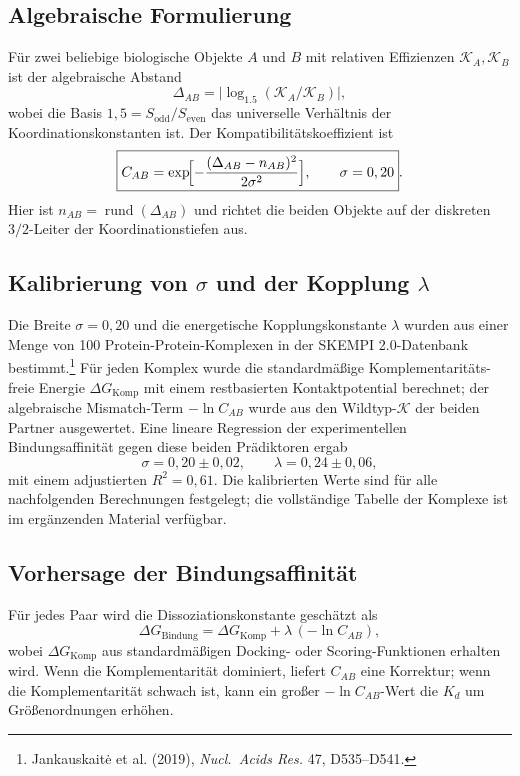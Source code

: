 \documentclass[12pt,a4paper]{article}
\newcommand{\REL}{\mathcal{K}}          %
\begin{document}
	\subsection{Algebraische Formulierung}
	Für zwei beliebige biologische Objekte \(A\) und \(B\) mit relativen Effizienzen \(\REL_A,\REL_B\) ist der algebraische Abstand
	\[
	\Delta_{AB} = \bigl|\log_{1.5}(\REL_A/\REL_B)\bigr|,
	\]
	wobei die Basis \(1,5 = S_{\mathrm{odd}}/S_{\mathrm{even}}\) das universelle Verhältnis der Koordinationskonstanten ist. Der Kompatibilitätskoeffizient ist
	\begin{equation}
		\boxed{C_{AB} = \exp\!\Bigl[-\frac{(\Delta_{AB}-n_{AB})^2}{2\sigma^2}\Bigr],\qquad \sigma = 0,20}.
		\label{eq:Cab}
	\end{equation}
	Hier ist \(n_{AB} = \operatorname{rund}(\Delta_{AB})\) und richtet die beiden Objekte auf der diskreten \(3/2\)-Leiter der Koordinationstiefen aus.
	
	\subsection{Kalibrierung von \(\sigma\) und der Kopplung \(\lambda\)}
	Die Breite \(\sigma = 0,20\) und die energetische Kopplungskonstante \(\lambda\) wurden aus einer Menge von 100 Protein-Protein-Komplexen in der SKEMPI 2.0-Datenbank bestimmt.\footnote{Jankauskaitė et al. (2019), \emph{Nucl.\ Acids Res.} 47, D535–D541.} Für jeden Komplex wurde die standardmäßige Komplementaritäts-freie Energie \(\Delta G_{\mathrm{Komp}}\) mit einem restbasierten Kontaktpotential berechnet; der algebraische Mismatch-Term \(-\ln C_{AB}\) wurde aus den Wildtyp-\(\REL\) der beiden Partner ausgewertet. Eine lineare Regression der experimentellen Bindungsaffinität gegen diese beiden Prädiktoren ergab
	\[
	\sigma = 0,20 \pm 0,02,\qquad \lambda = 0,24 \pm 0,06,
	\]
	mit einem adjustierten \(R^2 = 0,61\).
	Die kalibrierten Werte sind für alle nachfolgenden Berechnungen festgelegt; die vollständige Tabelle der Komplexe ist im ergänzenden Material verfügbar.
	
	\subsection{Vorhersage der Bindungsaffinität}
	Für jedes Paar wird die Dissoziationskonstante geschätzt als
	\[
	\Delta G_{\mathrm{Bindung}} = \Delta G_{\mathrm{Komp}} + \lambda\,(-\ln C_{AB}),
	\label{eq:Kd}
	\]
	wobei \(\Delta G_{\mathrm{Komp}}\) aus standardmäßigen Docking- oder Scoring-Funktionen erhalten wird. Wenn die Komplementarität dominiert, liefert \(C_{AB}\) eine Korrektur; wenn die Komplementarität schwach ist, kann ein großer \(-\ln C_{AB}\)-Wert die \(K_d\) um Größenordnungen erhöhen.
	
\end{document}

